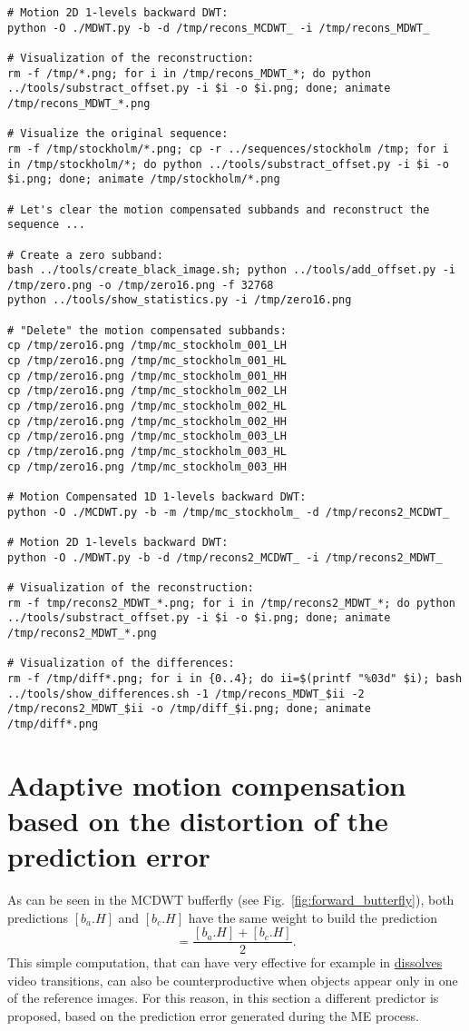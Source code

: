 \begin{verbatim}
# Motion 2D 1-levels backward DWT:
python -O ./MDWT.py -b -d /tmp/recons_MCDWT_ -i /tmp/recons_MDWT_

# Visualization of the reconstruction:
rm -f /tmp/*.png; for i in /tmp/recons_MDWT_*; do python ../tools/substract_offset.py -i $i -o $i.png; done; animate /tmp/recons_MDWT_*.png

# Visualize the original sequence:
rm -f /tmp/stockholm/*.png; cp -r ../sequences/stockholm /tmp; for i in /tmp/stockholm/*; do python ../tools/substract_offset.py -i $i -o $i.png; done; animate /tmp/stockholm/*.png

# Let's clear the motion compensated subbands and reconstruct the sequence ...

# Create a zero subband:
bash ../tools/create_black_image.sh; python ../tools/add_offset.py -i /tmp/zero.png -o /tmp/zero16.png -f 32768
python ../tools/show_statistics.py -i /tmp/zero16.png

# "Delete" the motion compensated subbands:
cp /tmp/zero16.png /tmp/mc_stockholm_001_LH
cp /tmp/zero16.png /tmp/mc_stockholm_001_HL
cp /tmp/zero16.png /tmp/mc_stockholm_001_HH
cp /tmp/zero16.png /tmp/mc_stockholm_002_LH
cp /tmp/zero16.png /tmp/mc_stockholm_002_HL
cp /tmp/zero16.png /tmp/mc_stockholm_002_HH
cp /tmp/zero16.png /tmp/mc_stockholm_003_LH
cp /tmp/zero16.png /tmp/mc_stockholm_003_HL
cp /tmp/zero16.png /tmp/mc_stockholm_003_HH

# Motion Compensated 1D 1-levels backward DWT:
python -O ./MCDWT.py -b -m /tmp/mc_stockholm_ -d /tmp/recons2_MCDWT_

# Motion 2D 1-levels backward DWT:
python -O ./MDWT.py -b -d /tmp/recons2_MCDWT_ -i /tmp/recons2_MDWT_

# Visualization of the reconstruction:
rm -f tmp/recons2_MDWT_*.png; for i in /tmp/recons2_MDWT_*; do python ../tools/substract_offset.py -i $i -o $i.png; done; animate /tmp/recons2_MDWT_*.png

# Visualization of the differences:
rm -f /tmp/diff*.png; for i in {0..4}; do ii=$(printf "%03d" $i); bash ../tools/show_differences.sh -1 /tmp/recons_MDWT_$ii -2 /tmp/recons2_MDWT_$ii -o /tmp/diff_$i.png; done; animate /tmp/diff*.png
\end{verbatim}

\section{Adaptive motion compensation based on the distortion of the prediction error}
As can be seen in the MCDWT bufferfly (see
Fig.~\ref{fig:forward_butterfly}), both predictions $[b_a.H]$ and
$[b_c.H]$ have the same weight to build the prediction
\begin{equation}
  [\hat{b.H}] = \frac{[b_a.H] + [b_c.H]}{2}.
\end{equation}
This simple computation, that can have very effective for example in
\href{https://biteable.com/blog/tips/video-transitions-effects-examples/}{dissolves}
video transitions, can also be counterproductive when objects appear
only in one of the reference images. For this reason, in this section
a different predictor is proposed, based on the prediction error
generated during the ME process.

